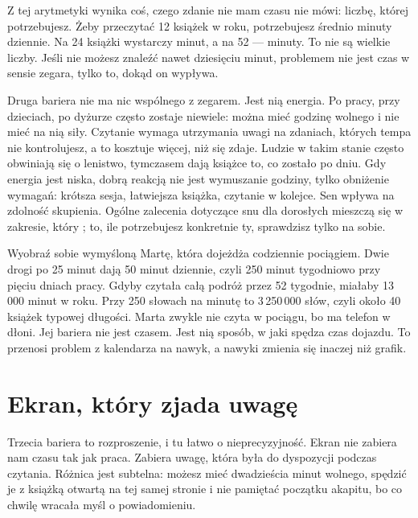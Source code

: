 Z tej arytmetyki wynika coś, czego zdanie \glqq nie mam czasu\grqq{} nie mówi: liczbę, której potrzebujesz. Żeby przeczytać 12 książek w roku, potrzebujesz średnio  minuty dziennie. Na 24 książki wystarczy  minut, a na 52 ---  minuty. To nie są wielkie liczby. Jeśli nie możesz znaleźć nawet dziesięciu minut, problemem nie jest czas w sensie zegara, tylko to, dokąd on wypływa.

Druga bariera nie ma nic wspólnego z zegarem. Jest nią energia. Po pracy, przy dzieciach, po dyżurze często zostaje niewiele: można mieć godzinę wolnego i nie mieć na nią siły. Czytanie wymaga utrzymania uwagi na zdaniach, których tempa nie kontrolujesz, a to kosztuje więcej, niż się zdaje. Ludzie w takim stanie często obwiniają się o lenistwo, tymczasem dają książce to, co zostało po dniu. Gdy energia jest niska, dobrą reakcją nie jest wymuszanie godziny, tylko obniżenie wymagań: krótsza sesja, łatwiejsza książka, czytanie w kolejce. Sen wpływa na zdolność skupienia. Ogólne zalecenia dotyczące snu dla dorosłych mieszczą się w zakresie, który ; to, ile potrzebujesz konkretnie ty, sprawdzisz tylko na sobie.

\begin{przyklad}
Wyobraź sobie wymyśloną Martę, która dojeżdża codziennie pociągiem. Dwie drogi po 25 minut dają 50 minut dziennie, czyli 250 minut tygodniowo przy pięciu dniach pracy. Gdyby czytała całą podróż przez 52 tygodnie, miałaby 13\,000 minut w roku. Przy 250 słowach na minutę to 3\,250\,000 słów, czyli około 40 książek typowej długości. Marta zwykle nie czyta w pociągu, bo ma telefon w dłoni. Jej bariera nie jest czasem. Jest nią sposób, w jaki spędza czas dojazdu. To przenosi problem z kalendarza na nawyk, a nawyki zmienia się inaczej niż grafik.
\end{przyklad}

\section{Ekran, który zjada uwagę}

Trzecia bariera to rozproszenie, i tu łatwo o nieprecyzyjność. Ekran nie zabiera nam czasu tak jak praca. Zabiera uwagę, która była do dyspozycji podczas czytania. Różnica jest subtelna: możesz mieć dwadzieścia minut wolnego, spędzić je z książką otwartą na tej samej stronie i nie pamiętać początku akapitu, bo co chwilę wracała myśl o powiadomieniu.

